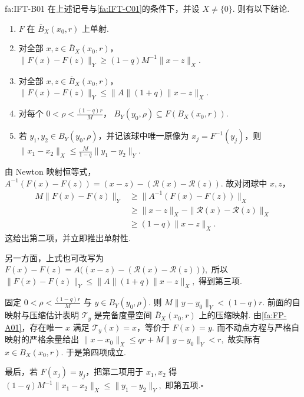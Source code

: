 \begin{FATheorem}[B][定量逆函数估计]{fa:IFT-B01}
在上述记号与\autoref{fa:IFT-C01}的条件下，并设 \(\displaystyle X\neq\{0\}\). 则有以下结论.
\begin{enumerate}[label=(\roman*)]
\item \(\displaystyle F\) 在 \(\displaystyle\overline B_X(x_0,r)\) 上单射.
\item 对全部 \(\displaystyle x,z\in\overline B_X(x_0,r)\)，
\(\displaystyle \|F(x)-F(z)\|_Y \geqslant (1-q)M^{-1}\|x-z\|_X.\)
\item 对全部 \(\displaystyle x,z\in\overline B_X(x_0,r)\)，
\(\displaystyle \|F(x)-F(z)\|_Y \leqslant \|A\|(1+q)\|x-z\|_X.\)
\item 对每个 \(\displaystyle0<\rho<\frac{(1-q)r}{M}\)，
\(\displaystyle B_Y(y_0,\rho) \subseteq F(B_X(x_0,r)).\)
\item 若 \(\displaystyle y_1,y_2\in B_Y(y_0,\rho)\)，并记该球中唯一原像为 \(\displaystyle x_j=F^{-1}(y_j)\)，则
\(\displaystyle \|x_1-x_2\|_X \leqslant \frac{M}{1-q}\|y_1-y_2\|_Y.\)
\end{enumerate}
\end{FATheorem}

\begin{FAProof}
由 Newton 映射恒等式，
\(\displaystyle A^{-1}(F(x)-F(z)) = (x-z)-(\mathcal R(x)-\mathcal R(z)).\)
故对闭球中 \(\displaystyle x,z\)，
\[
\begin{aligned}
M\|F(x)-F(z)\|_Y
&\geqslant
\|A^{-1}(F(x)-F(z))\|_X\\
&\geqslant
\|x-z\|_X-
\|\mathcal R(x)-\mathcal R(z)\|_X\\
&\geqslant
(1-q)\|x-z\|_X.
\end{aligned}
\]
这给出第二项，并立即推出单射性.

另一方面，上式也可改写为
\(\displaystyle F(x)-F(z) = A\bigl((x-z)-(\mathcal R(x)-\mathcal R(z))\bigr),\)
所以
\(\displaystyle \|F(x)-F(z)\|_Y \leqslant \|A\|(1+q)\|x-z\|_X,\)
得到第三项.

固定 \(\displaystyle0<\rho<\frac{(1-q)r}{M}\) 与 \(\displaystyle y\in B_Y(y_0,\rho)\). 则
\(\displaystyle M\|y-y_0\|_Y < (1-q)r.\)
前面的自映射与压缩估计表明 \(\displaystyle\mathcal T_y\) 是完备度量空间 \(\displaystyle\overline B_X(x_0,r)\) 上的压缩映射. 由\autoref{fa:FP-A01}，存在唯一 \(\displaystyle x\) 满足 \(\displaystyle\mathcal T_y(x)=x\)，等价于 \(\displaystyle F(x)=y\). 而不动点方程与严格自映射的严格余量给出
\(\displaystyle \|x-x_0\|_X \leqslant qr+M\|y-y_0\|_Y <r,\)
故实际有 \(\displaystyle x\in B_X(x_0,r)\). 于是第四项成立.

最后，若 \(\displaystyle F(x_j)=y_j\)，把第二项用于 \(\displaystyle x_1,x_2\) 得
\(\displaystyle (1-q)M^{-1}\|x_1-x_2\|_X \leqslant \|y_1-y_2\|_Y,\)
即第五项.\hfill\(\square\)

\end{FAProof}

